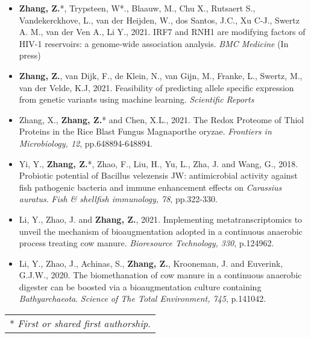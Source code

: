 \documentclass[10pt,A4,english]{article}
\newcommand{\mpwidth}{\linewidth-\fboxsep-\fboxsep}
\newcommand{\cvtextsmall}[1] {
	\begin{tabular*}{0.8\mpwidth}{p{0.8\mpwidth}}
		\parbox{0.8\mpwidth}{#1}
	\end{tabular*}
}
\begin{document}
\begin{paracol}{2}
\begin{rightcolumn}
\begin{itemize}[leftmargin=*]
\item \textbf{Zhang, Z.}*, Trypsteen, W*., Blaauw, M., Chu X., Rutsaert S., Vandekerckhove, L., van der Heijden, W., dos Santos, J.C., Xu C-J., Swertz A. M., van der Ven A., Li Y., 2021. IRF7 and RNH1 are modifying factors of HIV-1 reservoirs: a genome-wide association analysis. \textit{BMC Medicine} (In press)
\item \textbf{Zhang, Z.}, van Dijk, F., de Klein, N., van Gijn, M., Franke, L., Swertz, M., van der Velde, K.J, 2021. Feasibility of predicting allele specific expression from genetic variants using machine learning. \textit{Scientific Reports}
\item Zhang, X., \textbf{Zhang, Z.}* and Chen, X.L., 2021. The Redox Proteome of Thiol Proteins in the Rice Blast Fungus Magnaporthe oryzae. \textit{Frontiers in Microbiology, 12}, pp.648894-648894.
\item Yi, Y., \textbf{Zhang, Z.}*, Zhao, F., Liu, H., Yu, L., Zha, J. and Wang, G., 2018. Probiotic potential of Bacillus velezensis JW: antimicrobial activity against fish pathogenic bacteria and immune enhancement effects on \textit{Carassius auratus}. \textit{Fish \& shellfish immunology, 78}, pp.322-330.
\item Li, Y., Zhao, J. and \textbf{Zhang, Z.}, 2021. Implementing metatranscriptomics to unveil the mechanism of bioaugmentation adopted in a continuous anaerobic process treating cow manure. \textit{Bioresource Technology, 330}, p.124962.
\item Li, Y., Zhao, J., Achinas, S., \textbf{Zhang, Z.}, Krooneman, J. and Euverink, G.J.W., 2020. The biomethanation of cow manure in a continuous anaerobic digester can be boosted via a bioaugmentation culture containing \textit{Bathyarchaeota}. \textit{Science of The Total Environment, 745}, p.141042.
\end{itemize}

\cvtextsmall{* \textit{First or shared first authorship}.}

% 

\end{rightcolumn}
\end{paracol}
\end{document}
